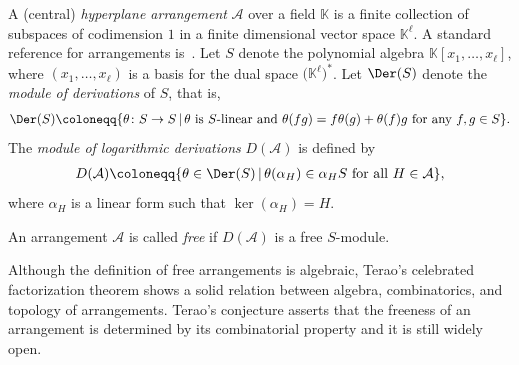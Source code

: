 A (central) \textit{hyperplane arrangement} $ \mathcal{A} $ over a field $ \mathbb{K} $ is a finite collection of subspaces of codimension $ 1 $ in a finite dimensional vector space $ \mathbb{K}^{\ell} $.
A standard reference for arrangements is~\cite{orlik1992arrangements}.
Let $ S $ denote the polynomial algebra $ \mathbb{K}[x_{1}, \dots, x_{\ell}] $, where $ (x_{1}, \dots, x_{\ell}) $ is a basis for the dual space $ \big(\mathbb{K}^{\ell}\big) ^{\ast} $.
Let $ \Der(S) $ denote the \textit{module of derivations} of $ S $, that is,
\begin{gather*}
\Der(S) \coloneqq \{ \theta \colon S \to S \,|\, \theta \text{ is $ S $-linear and } \theta(fg) = f\theta(g) + \theta(f)g \text{ for any } f,g \in S \}.
\end{gather*}
The \textit{module of logarithmic derivations} $ D(\mathcal{A}) $ is defined by
\begin{gather*}
D(\mathcal{A}) \coloneqq \{ \theta \in \Der(S) \,|\, \theta(\alpha_{H}) \in \alpha_{H}S \text{ for all } H \in \mathcal{A} \},
\end{gather*}
where $ \alpha_{H} $ is a linear form such that $ \ker(\alpha_{H}) = H $.

\begin{Definition}
An arrangement $ \mathcal{A} $ is called \textit{free} if $ D(\mathcal{A}) $ is a free $ S $-module.
\end{Definition}

Although the definition of free arrangements is algebraic, Terao's celebrated factorization theorem \cite[Main Theorem]{terao1981generalized-im} shows a solid relation between algebra, combinatorics, and topology of arrangements.
Terao's conjecture asserts that the freeness of an arrangement is determined by its combinatorial property and it is still widely open.
